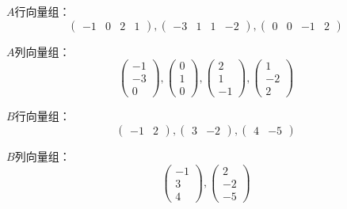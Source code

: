 \documentclass[a4paper]{report}
\begin{document}
\begin{jie}
$A$行向量组：
\begin{equation*}
\begin{pmatrix}
-1&0&2&1
\end{pmatrix},
\begin{pmatrix}
-3& 1&1&-2
\end{pmatrix},
\begin{pmatrix}
0&0&-1&2
\end{pmatrix}
\end{equation*}

$A$列向量组：
\begin{equation*}
\begin{pmatrix}
-1\\ -3\\ 0
\end{pmatrix},
\begin{pmatrix}
0\\ 1\\ 0
\end{pmatrix},
\begin{pmatrix}
2\\ 1\\ -1
\end{pmatrix},
\begin{pmatrix}
1\\ -2\\ 2
\end{pmatrix}
\end{equation*}

$B$行向量组：
\begin{equation*}
\begin{pmatrix}
-1&2
\end{pmatrix},
\begin{pmatrix}
3&-2
\end{pmatrix},
\begin{pmatrix}
4&-5
\end{pmatrix}
\end{equation*}

$B$列向量组：
\begin{equation*}
\begin{pmatrix}
-1\\ 3\\ 4
\end{pmatrix},
\begin{pmatrix}
2\\ -2\\ -5
\end{pmatrix}
\end{equation*}
\end{jie}
\end{document}
